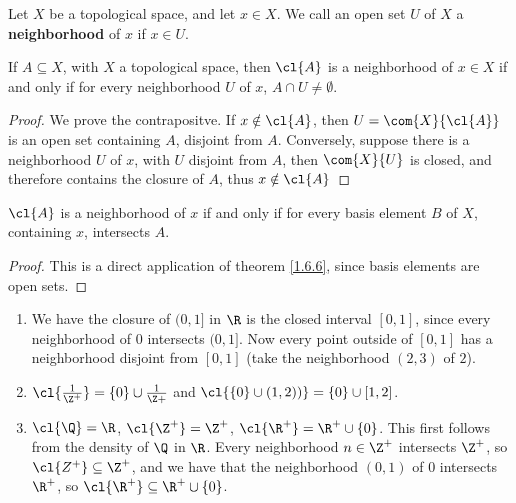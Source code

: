 \begin{definition}
    Let $X$ be a topological space, and let  $x \in X$. We call an open set  $U$
    of  $X$ a \textbf{neighborhood} of  $x$ if  $x \in U$.
\end{definition}

\begin{theorem}\label{1.6.6}
    If $A \subseteq X$, with  $X$ a topological space, then  $\cl{A}$ is a
    neighborhood of  $x \in X$ if and only if for every neighborhood  $U$ of
    $x$,  $A \cap U \neq \emptyset$.
\end{theorem}
\begin{proof}
    We prove the contrapositve. If $x \notin \cl{A}$, then
    $U=\com{X}{\cl{A}}$ is an open set containing  $A$, disjoint from
    $A$. Conversely, suppose there is a neighborhood $U$ of $x$, with $U$
    disjoint from  $A$, then  $\com{X}{U}$ is closed, and therefore contains the
    closure of  $A$, thus  $x \notin \cl{A}$
\end{proof}
\begin{corollary}
    $\cl{A}$ is a neighborhood of  $x$ if and only if for every basis element
    $B$ of  $X$, containing  $x$, intersects  $A$.
\end{corollary}
\begin{proof}
    This is a direct application of theorem \ref{1.6.6}, since basis elements
    are open sets.	
\end{proof}

\begin{example}
    \begin{enumerate}[label=(\arabic*)]
        \item We have the closure of $(0,1]$ in  $\R$ is the closed interval
            $[0,1]$, since every neighborhood of $0$ intersects  $(0,1]$. Now
            every point outside of  $[0,1]$ has a neighborhood disjoint from
            $[0,1]$  (take the neighborhood $(2,3)$ of  $2$).

        \item $\cl{\frac{1}{\Z^+}}=\{0\} \cup \frac{1}{\Z+}$ and $\cl{\{0\} \cup
            (1,2))}=\{0\} \cup [1,2]$.

        \item $\cl{\Q}=\R$,  $\cl{\Z^+}=\Z^+$,  $\cl{\R^+}=\R^+ \cup \{0\}$.
            This first follows from the density of $\Q$ in  $\R$. Every
            neighborhood  $n \in \Z^+$ intersects  $\Z^+$, so  $\cl{Z^+}
            \subseteq \Z^+$, and we have that the neighborhood  $(0,1)$ of  $0$ 
            intersects $\R^+$, so  $\cl{\R^+} \subseteq \R^+ \cup \{0\}$.
    \end{enumerate}		
\end{example} 

